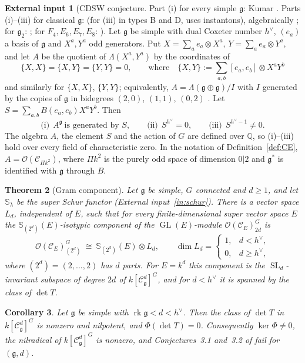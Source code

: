 \documentclass[11pt]{article}
\newtheorem{theorem}{Theorem}[section]
\newtheorem{corollary}[theorem]{Corollary}
\theoremstyle{definition}
\newtheorem{inputthm}[theorem]{External input}
\newcommand{\g}{\mathfrak g}
\newcommand{\Cs}{\mathcal C}
\newcommand{\Oo}{\mathcal O}
\newcommand{\rk}{\operatorname{rk}}
\newcommand{\Sf}{\mathbb S}
\newcommand{\hv}{h^\vee}
\DeclareMathOperator{\GL}{GL}
\DeclareMathOperator{\SL}{SL}
\begin{document}
\begin{inputthm}[{CDSW conjecture. Part (i) for every simple $\g$: Kumar \cite{Ku08}. Parts (i)--(iii) for classical $\g$: \cite{CDSW,Wi03} (for (iii) in types B and D, \cite{Wi03} uses instantons), algebraically \cite{Et03}; for $\g_2$: \cite{EK03}; for $F_4,E_6,E_7,E_8$: \cite[Prop.~2, Thm.~1, Cor.~2]{CF23}}]\label{in:CDSW}
Let $\g$ be simple with dual Coxeter number $\hv$, $(e_a)$ a basis of $\g$ and $X^a,Y^a$ odd generators. Put $X=\sum_ae_a\otimes X^a$, $Y=\sum_ae_a\otimes Y^a$, and let $A$ be the quotient of $\Lambda(X^a,Y^a)$ by the coordinates of
\[
\{X,X\}=\{X,Y\}=\{Y,Y\}=0,\qquad\text{where}\quad \{X,Y\}:=\textstyle\sum_{a,b}[e_a,e_b]\otimes X^aY^b
\]
and similarly for $\{X,X\}$, $\{Y,Y\}$; equivalently, $A=\Lambda(\g\oplus\g)/I$ with $I$ generated by the copies of $\g$ in bidegrees $(2,0)$, $(1,1)$, $(0,2)$ \cite[\S1]{EK03}. Let $S=\sum_{a,b}B(e_a,e_b)X^aY^b$. Then \cite[Conj.~1.1]{EK03}
\[
\text{(i)}\ \ A^\g\ \text{is generated by } S,\qquad \text{(ii)}\ \ S^{\hv}=0,\qquad \text{(iii)}\ \ S^{\hv-1}\neq0 .
\]
The algebra $A$, the element $S$ and the action of $G$ are defined over $\mathbb Q$, so (i)--(iii) hold over every field of characteristic zero. In the notation of Definition~\ref{def:CE}, $A=\Oo(\Cs_{\Pi k^2})$, where $\Pi k^2$ is the purely odd space of dimension $0|2$ and $\g^*$ is identified with $\g$ through $B$.
\end{inputthm}

\begin{theorem}[Gram component]\label{thm:A}
Let $\g$ be simple, $G$ connected and $d\ge1$, and let $\Sf_\lambda$ be the super Schur functor (External input~\ref{in:schur}). There is a vector space $L_d$, independent of $E$, such that for every finite-dimensional super vector space $E$ the $\Sf_{(2^d)}(E)$-isotypic component of the $\GL(E)$-module $\Oo(\Cs_E)^G_{2d}$ is
\[
\Oo(\Cs_E)^G_{(2^d)}\ \cong\ \Sf_{(2^d)}(E)\otimes L_d,\qquad
\dim L_d=\begin{cases}1,& d<\hv,\\ 0,& d\ge\hv,\end{cases}
\]
where $(2^d)=(2,\dots,2)$ has $d$ parts. For $E=k^d$ this component is the $\SL_d$-invariant subspace of degree $2d$ of $k[\Cs^d_\g]^G$, and for $d<\hv$ it is spanned by the class of $\det T$.
\end{theorem}

\begin{corollary}\label{cor:B}
Let $\g$ be simple with $\rk\g<d<\hv$. Then the class of $\det T$ in $k[\Cs^d_\g]^G$ is nonzero and nilpotent, and $\Phi(\det T)=0$. Consequently $\ker\Phi\neq0$, the nilradical of $k[\Cs^d_\g]^G$ is nonzero, and Conjectures~3.1 and~3.2 of \cite{CN20} fail for $(\g,d)$.
\end{corollary}
\end{document}
